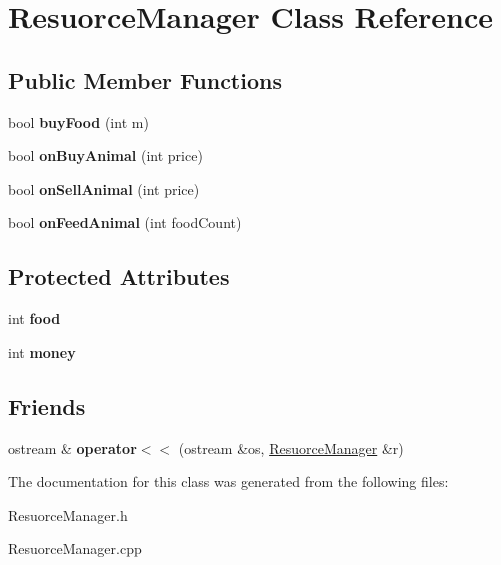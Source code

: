 \hypertarget{class_resuorce_manager}{}\section{Resuorce\+Manager Class Reference}
\label{class_resuorce_manager}
\subsection*{Public Member Functions}
\begin{DoxyCompactItemize}
\item 
\mbox{\label{class_resuorce_manager_ab695c8e1d5832a7c8584ab76eb5c7e96}} 
bool {\bfseries buy\+Food} (int m)
\item 
\mbox{\label{class_resuorce_manager_ac36a816e1164e3199e6f0747d9476e3c}} 
bool {\bfseries on\+Buy\+Animal} (int price)
\item 
\mbox{\label{class_resuorce_manager_ab534e16078bff88c9c77a017b4ee87c4}} 
bool {\bfseries on\+Sell\+Animal} (int price)
\item 
\mbox{\label{class_resuorce_manager_a2d14b617098ad105ad90fa135128f35f}} 
bool {\bfseries on\+Feed\+Animal} (int food\+Count)
\end{DoxyCompactItemize}
\subsection*{Protected Attributes}
\begin{DoxyCompactItemize}
\item 
\mbox{\label{class_resuorce_manager_ab56d204cee3db3f1c0ecd49b457a6de0}} 
int {\bfseries food}
\item 
\mbox{\label{class_resuorce_manager_ab305ccf6a9c242ddfd736baeef1f7463}} 
int {\bfseries money}
\end{DoxyCompactItemize}
\subsection*{Friends}
\begin{DoxyCompactItemize}
\item 
\mbox{\label{class_resuorce_manager_aad53dd7ece0ac1d6fd4359b868cf2c6c}} 
ostream \& {\bfseries operator$<$$<$} (ostream \&os, \hyperlink{class_resuorce_manager}{Resuorce\+Manager} \&r)
\end{DoxyCompactItemize}


The documentation for this class was generated from the following files\+:\begin{DoxyCompactItemize}
\item 
Resuorce\+Manager.\+h\item 
Resuorce\+Manager.\+cpp\end{DoxyCompactItemize}
